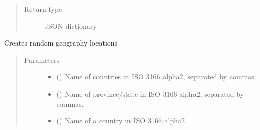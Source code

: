 \documentclass[letterpaper,10pt,english]{sphinxmanual}
\begin{document}
\begin{fulllineitems}
\begin{fulllineitems}
\begin{quote}
\begin{description}
\item[{Return type}] \leavevmode
\sphinxAtStartPar
JSON dictionary

\end{description}\end{quote}

\end{fulllineitems}


\begin{fulllineitems}
\label{\detokenize{CE_app.synth_phr:CE_app.synth_phr.functions.Domains.geography}}
\sphinxAtStartPar
Creates random geography locations
\begin{quote}\begin{description}
\item[{Parameters}] \leavevmode\begin{itemize}
\item {} 
\sphinxAtStartPar
{} () \textendash{} Name of countries in ISO 3166 alpha\sphinxhyphen{}2, separated by commas.

\item {} 
\sphinxAtStartPar
{} () \textendash{} Name of province/state in ISO 3166 alpha\sphinxhyphen{}2, separated by commas.

\item {} 
\sphinxAtStartPar
{} () \textendash{} Name of a country in ISO 3166 alpha\sphinxhyphen{}2.


\end{itemize}
\end{description}
\end{quote}
\end{fulllineitems}
\end{fulllineitems}
\end{document}
